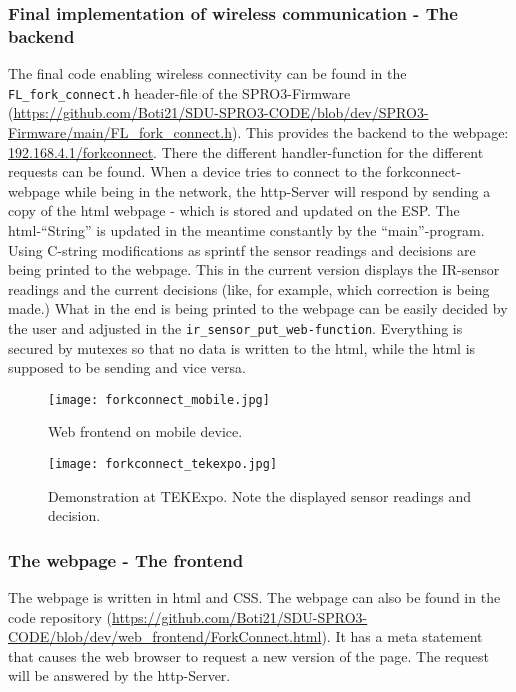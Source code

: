 \documentclass[../report.tex]{subfiles}
\begin{document}
\subsubsection{Final implementation of wireless communication - The backend}
The final code enabling wireless connectivity can be found in the 
\texttt{FL\_fork\_connect.h} header-file of the SPRO3-Firmware (\url{https://github.com/Boti21/SDU-SPRO3-CODE/blob/dev/SPRO3-Firmware/main/FL_fork_connect.h}).
This provides the backend to the webpage: \url{192.168.4.1/forkconnect}.
There the different handler-function for the different requests can be found.
When a device tries to connect to the forkconnect-webpage while being in the network,
the http-Server will respond by sending a copy of the html webpage - which is stored and updated on the ESP. The html-``String'' is updated in the 
meantime constantly by the ``main''-program. Using C-string modifications as sprintf the sensor readings
and decisions are being printed to the webpage. This in the current version displays the IR-sensor readings
and the current decisions (like, for example, which correction is being made.) What in the end is being 
printed to the webpage can be easily decided by the user and adjusted in the \texttt{ir\_sensor\_put\_web-function}.
Everything is secured by mutexes so that no data is written to the html, while the html is supposed
to be sending and vice versa. 
\begin{figure}[H]
    \centering
    \texttt{[image: forkconnect\_mobile.jpg]}
    \caption{Web frontend on mobile device.}
    
\end{figure} 
\begin{figure}[H]
    \centering
    \texttt{[image: forkconnect\_tekexpo.jpg]}
    \caption{Demonstration at TEKExpo. Note the displayed sensor readings and decision.}
\end{figure} 
\subsubsection{The webpage - The frontend}
The webpage is written in html and CSS. The webpage can also be found in the code 
repository (\url{https://github.com/Boti21/SDU-SPRO3-CODE/blob/dev/web_frontend/ForkConnect.html}).
It has a meta statement that causes the web browser to request a new version of the page.
The request will be answered by the http-Server. 
\end{document}
